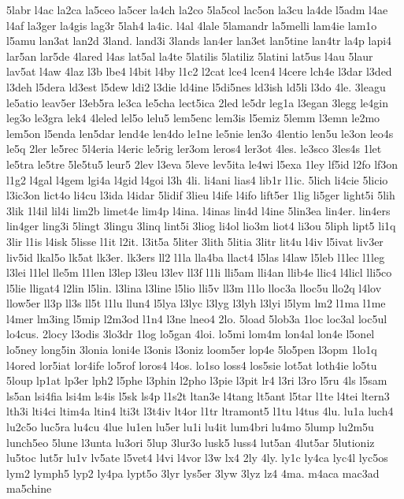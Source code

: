 {5labr
l4ac
la2ca
la5ceo
la5cer
la4ch
la2co
5la5col
lac5on
la3cu
la4de
l5adm
l4ae
l4af
la3ger
la4gis
lag3r
5lah4
la4ic.
l4al
4lale
5lamandr
la5melli
lam4ie
lam1o
l5amu
lan3at
lan2d
3land.
land3i
3lands
lan4er
lan3et
lan5tine
lan4tr
la4p
lapi4
lar5an
lar5de
4lared
l4as
lat5al
la4te
5latilis
5latiliz
5latini
lat5us
l4au
5laur
lav5at
l4aw
4laz
l3b
lbe4
l4bit
l4by
l1c2
l2cat
lce4
lcen4
l4cere
lch4e
l3dar
l3ded
l3deh
l5dera
ld3est
l5dew
ldi2
l3die
ld4ine
l5di5nes
ld3ish
ld5li
l3do
4le.
3leagu
le5atio
leav5er
l3eb5ra
le3ca
le5cha
lect5ica
2led
le5dr
leg1a
l3egan
3legg
le4gin
leg3o
le3gra
lek4
4leled
lel5o
lelu5
lem5enc
lem3is
l5emiz
5lemm
l3emn
le2mo
lem5on
l5enda
len5dar
lend4e
len4do
le1ne
le5nie
len3o
4lentio
len5u
le3on
leo4s
le5q
2ler
le5rec
5l4eria
l4eric
le5rig
ler3om
leros4
ler3ot
4les.
le3sco
3les4s
1let
le5tra
le5tre
5le5tu5
leur5
2lev
l3eva
5leve
lev5ita
le4wi
l5exa
1ley
lf5id
l2fo
lf3on
l1g2
l4gal
l4gem
lgi4a
l4gid
l4goi
l3h
4li.
li4ani
lias4
lib1r
l1ic.
5lich
li4cie
5licio
l3ic3on
lict4o
li4cu
l3ida
l4idar
5lidif
3lieu
l4ife
l4ifo
lift5er
1lig
li5ger
light5i
5lih
3lik
1l4il
lil4i
lim2b
limet4e
lim4p
l4ina.
l4inas
lin4d
l4ine
5lin3ea
lin4er.
lin4ers
lin4ger
ling3i
5lingt
3lingu
3linq
lint5i
3liog
li4ol
lio3m
liot4
li3ou
5liph
lipt5
li1q
3lir
l1is
l4isk
5lisse
l1it
l2it.
l3it5a
5liter
3lith
5litia
3litr
lit4u
l4iv
l5ivat
liv3er
liv5id
lkal5o
lk5at
lk3er.
lk3ers
ll2
l1la
lla4ba
llact4
l5las
l4law
l5leb
l1lec
l1leg
l3lei
l1lel
lle5m
l1len
l3lep
l3leu
l3lev
ll3f
l1li
lli5am
lli4an
llib4e
llic4
l4licl
lli5co
l5lie
lligat4
l2lin
l5lin.
l3lina
l3line
l5lio
lli5v
ll3m
l1lo
lloc3a
lloc5u
llo2q
l4lov
llow5er
ll3p
ll3s
ll5t
l1lu
llun4
l5lya
l3lyc
l3lyg
l3lyh
l3lyi
l5lym
lm2
l1ma
l1me
l4mer
lm3ing
l5mip
l2m3od
l1n4
l3ne
lneo4
2lo.
5load
5lob3a
1loc
loc3al
loc5ul
lo4cus.
2locy
l3odis
3lo3dr
1log
lo5gan
4loi.
lo5mi
lom4m
lon4al
lon4e
l5onel
lo5ney
long5in
3lonia
loni4e
l3onis
l3oniz
loom5er
lop4e
5lo5pen
l3opm
1lo1q
l4ored
lor5iat
lor4ife
lo5rof
loros4
l4os.
lo1so
loss4
los5sie
lot5at
loth4ie
lo5tu
5loup
lp1at
lp3er
lph2
l5phe
l3phin
l2pho
l3pie
l3pit
lr4
l3ri
l3ro
l5ru
4ls
l5sam
ls5an
lsi4fia
lsi4m
ls4is
l5sk
ls4p
l1s2t
ltan3e
l4tang
lt5ant
l5tar
l1te
l4tei
ltern3
lth3i
lti4ci
ltim4a
ltin4
lti3t
l3t4iv
lt4or
l1tr
ltramont5
l1tu
l4tus
4lu.
lu1a
luch4
lu2c5o
luc5ra
lu4cu
4lue
lu1en
lu5er
lu1i
lu4it
lum4bri
lu4mo
5lump
lu2m5u
lunch5eo
5lune
l3unta
lu3ori
5lup
3lur3o
lusk5
luss4
lut5an
4lut5ar
5lutioniz
lu5toc
lut5r
lu1v
lv5ate
l5vet4
l4vi
l4vor
l3w
lx4
2ly
4ly.
ly1c
ly4ca
lyc4l
lyc5os
lym2
lymph5
lyp2
ly4pa
lypt5o
3lyr
lys5er
3lyw
3lyz
lz4
4ma.
m4aca
mac3ad
ma5chine
}
